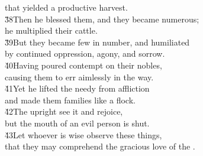 \begin{poetry}
\poemll    that yielded a productive harvest. \\
\poeml \v{38}Then he blessed them, and they became numerous; \\
\poemll    he multiplied their cattle. \\
\poeml \v{39}But they became few in number, and humiliated \\
\poemll    by continued oppression, agony, and sorrow. \\
\poeml \v{40}Having poured contempt on their nobles, \\
\poemll    causing them to err aimlessly in the way. \\
\poeml \v{41}Yet he lifted the needy from affliction \\
\poemll    and made them families like a flock. \\
\poeml \v{42}The upright see it and rejoice, \\
\poemll    but the mouth of an evil person is shut. \\
\poeml \v{43}Let whoever is wise observe these things, \\
\poemll    that they may comprehend the gracious love of the .
\end{poetry}

